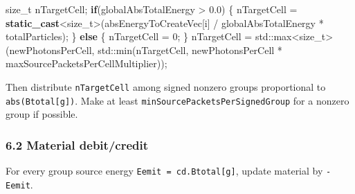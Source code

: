 \documentclass[
]{article}
\newenvironment{Shaded}{}{}
\newcommand{\BuiltInTok}[1]{\textcolor[rgb]{0.00,0.50,0.00}{#1}}
\newcommand{\ControlFlowTok}[1]{\textcolor[rgb]{0.00,0.44,0.13}{\textbf{#1}}}
\newcommand{\DataTypeTok}[1]{\textcolor[rgb]{0.56,0.13,0.00}{#1}}
\newcommand{\DecValTok}[1]{\textcolor[rgb]{0.25,0.63,0.44}{#1}}
\newcommand{\FloatTok}[1]{\textcolor[rgb]{0.25,0.63,0.44}{#1}}
\newcommand{\KeywordTok}[1]{\textcolor[rgb]{0.00,0.44,0.13}{\textbf{#1}}}
\newcommand{\NormalTok}[1]{#1}
\newcommand{\OperatorTok}[1]{\textcolor[rgb]{0.40,0.40,0.40}{#1}}
\begin{document}
\begin{Shaded}
\begin{Highlighting}[]
\DataTypeTok{size\_t}\NormalTok{ nTargetCell}\OperatorTok{;}
\ControlFlowTok{if}\OperatorTok{(}\NormalTok{globalAbsTotalEnergy }\OperatorTok{\textgreater{}} \FloatTok{0.0}\OperatorTok{)}
\OperatorTok{\{}
\NormalTok{    nTargetCell }\OperatorTok{=} \KeywordTok{static\_cast}\OperatorTok{\textless{}}\DataTypeTok{size\_t}\OperatorTok{\textgreater{}(}\NormalTok{absEnergyToCreateVec}\OperatorTok{[}\NormalTok{i}\OperatorTok{]} \OperatorTok{/}\NormalTok{ globalAbsTotalEnergy }\OperatorTok{*}\NormalTok{ totalParticles}\OperatorTok{);}
\OperatorTok{\}}
\ControlFlowTok{else}
\OperatorTok{\{}
\NormalTok{    nTargetCell }\OperatorTok{=} \DecValTok{0}\OperatorTok{;}
\OperatorTok{\}}
\NormalTok{nTargetCell }\OperatorTok{=} \BuiltInTok{std::}\NormalTok{max}\OperatorTok{\textless{}}\DataTypeTok{size\_t}\OperatorTok{\textgreater{}(}\NormalTok{newPhotonsPerCell}\OperatorTok{,} \BuiltInTok{std::}\NormalTok{min}\OperatorTok{(}\NormalTok{nTargetCell}\OperatorTok{,}\NormalTok{ newPhotonsPerCell }\OperatorTok{*}\NormalTok{ maxSourcePacketsPerCellMultiplier}\OperatorTok{));}
\end{Highlighting}
\end{Shaded}

Then distribute \texttt{nTargetCell} among signed nonzero groups
proportional to \texttt{abs(Btotal{[}g{]})}. Make at least
\texttt{minSourcePacketsPerSignedGroup} for a nonzero group if possible.

\subsubsection{6.2 Material debit/credit}\label{material-debitcredit}

For every group source energy \texttt{Eemit\ =\ cd.Btotal{[}g{]}},
update material by \texttt{-Eemit}.
\end{document}

